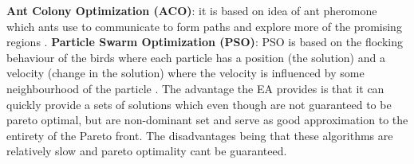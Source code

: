 \newline\newline \textbf{Ant Colony Optimization (ACO)}: \label{ant_colony_opt} it is based on idea of ant pheromone which ants use to communicate to form paths and explore more of the promising regions \cite{slowik2017nature}.
\newline\newline \textbf{Particle Swarm Optimization (PSO)}: \label{partical_swarm_opt} PSO is based on the flocking behaviour of the birds where each particle has a position (the solution) and a velocity (change in the solution) where the velocity is influenced by some neighbourhood of the particle \cite{poli2007particle}.
\newline\newline The advantage the EA provides is that it can quickly provide a sets of solutions which even though are not guaranteed to be pareto optimal, but are non-dominant set and serve as good approximation to the entirety of the Pareto front. The disadvantages being that these algorithms are relatively slow and pareto optimality cant be guaranteed.

